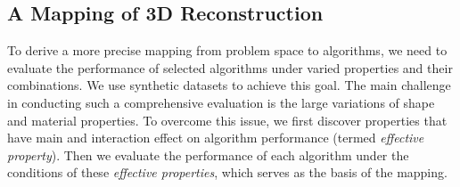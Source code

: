 \subsection{A Mapping of 3D Reconstruction}
To derive a more precise mapping from problem space to algorithms, we need to evaluate the performance of selected algorithms under varied properties and their combinations. We use synthetic datasets to achieve this goal. The main challenge in conducting such a comprehensive evaluation is the large variations of shape and material properties. To overcome this issue, we first discover properties that have main and interaction effect on algorithm performance (termed \textit{effective property}). Then we evaluate the performance of each algorithm under the conditions of these \textit{effective properties}, which serves as the basis of the mapping.




